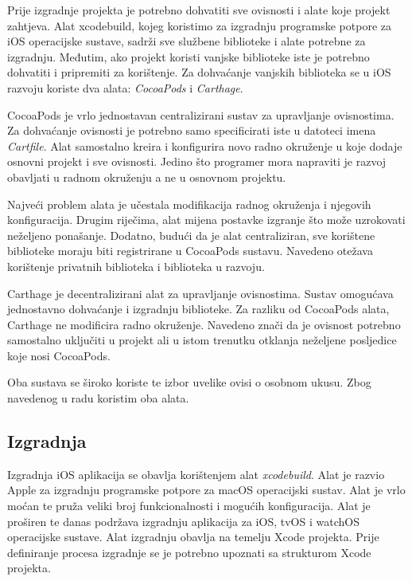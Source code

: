 \documentclass[times, utf8, diplomski, numeric]{fer}
\begin{document}
Prije izgradnje projekta je potrebno dohvatiti sve ovisnosti i alate koje projekt zahtjeva. Alat xcodebuild, kojeg koristimo za izgradnju programske potpore za iOS operacijske sustave, sadrži sve službene biblioteke i alate potrebne za izgradnju. Međutim, ako projekt koristi vanjske biblioteke iste je potrebno dohvatiti i pripremiti za korištenje. Za dohvaćanje vanjskih biblioteka se u iOS razvoju koriste dva alata: \textit{CocoaPods} i \textit{Carthage}.

CocoaPods je vrlo jednostavan centralizirani sustav za upravljanje ovisnostima. Za dohvaćanje ovisnosti je potrebno samo specificirati iste u datoteci imena \textit{Cartfile}. Alat samostalno kreira i konfigurira novo radno okruženje u koje dodaje osnovni projekt i sve ovisnosti. Jedino što programer mora napraviti je razvoj obavljati u radnom okruženju a ne u osnovnom projektu.

Najveći problem alata je učestala modifikacija radnog okruženja i njegovih konfiguracija. Drugim riječima, alat mijena postavke izgranje što može uzrokovati neželjeno ponašanje. Dodatno, budući da je alat centraliziran, sve korištene biblioteke moraju biti registrirane u CocoaPods sustavu. Navedeno otežava korištenje privatnih biblioteka i biblioteka u razvoju.

Carthage je decentralizirani alat za upravljanje ovisnostima. Sustav omogućava jednostavno dohvaćanje i izgradnju biblioteke. Za razliku od CocoaPods alata, Carthage ne modificira radno okruženje. Navedeno znači da je ovisnost potrebno samostalno uključiti u projekt ali u istom trenutku otklanja neželjene posljedice koje nosi CocoaPods.

Oba sustava se široko koriste te izbor uvelike ovisi o osobnom ukusu. Zbog navedenog u radu koristim oba alata.

\subsection{Izgradnja}

Izgradnja iOS aplikacija se obavlja korištenjem alat \textit{xcodebuild}\citep{xcodebuild}. Alat je razvio Apple za izgradnju programske potpore za macOS operacijski sustav. Alat je vrlo moćan te pruža veliki broj funkcionalnosti i mogućih konfiguracija. Alat je proširen te danas podržava izgradnju aplikacija za iOS, tvOS i watchOS operacijske sustave. Alat izgradnju obavlja na temelju Xcode projekta. Prije definiranje procesa izgradnje se je potrebno upoznati sa strukturom Xcode projekta.
\end{document}
